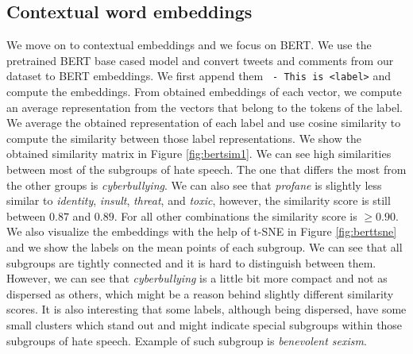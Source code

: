 \documentclass[fleqn,moreauthors,10pt]{ds_report}
\begin{document}
\subsection*{Contextual word embeddings}
We move on to contextual embeddings and we focus on BERT. We use the pretrained BERT base cased model \cite{dbpl} and convert tweets and comments from our dataset to BERT embeddings. We first append them \texttt{ - This is <label>} and compute the embeddings. From obtained embeddings of each vector, we compute an average representation from the vectors that belong to the tokens of the label. We average the obtained representation of each label and use cosine similarity to compute the similarity between those label representations. We show the obtained similarity matrix in Figure \ref{fig:bertsim1}. We can see high similarities between most of the subgroups of hate speech. The one that differs the most from the other groups is \textit{cyberbullying}. We can also see that \textit{profane} is slightly less similar to \textit{identity}, \textit{insult}, \textit{threat}, and \textit{toxic}, however, the similarity score is still between $0.87$ and $0.89$. For all other combinations the similarity score is $\ge 0.90$. We also visualize the embeddings with the help of t-SNE in Figure \ref{fig:berttsne} and we show the labels on the mean points of each subgroup. We can see that all subgroups are tightly connected and it is hard to distinguish between them. However, we can see that \textit{cyberbullying} is a little bit more compact and not as dispersed as others, which might be a reason behind slightly different similarity scores. It is also interesting that some labels, although being dispersed, have some small clusters which stand out and might indicate special subgroups within those subgroups of hate speech. Example of such subgroup is \textit{benevolent sexism}.
\end{document}

